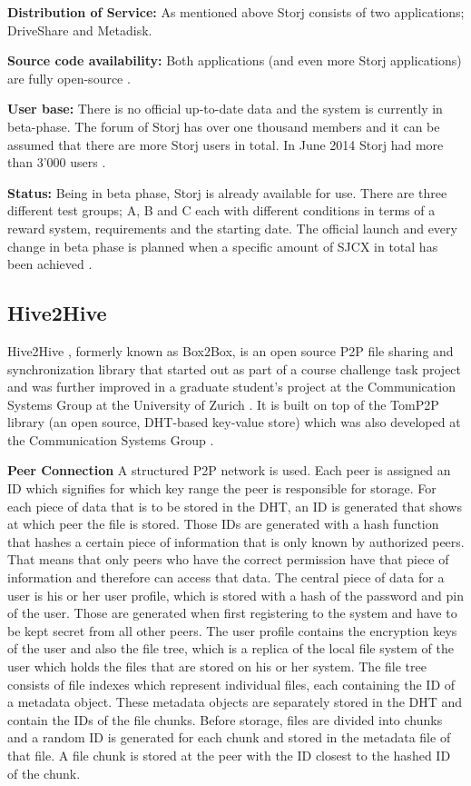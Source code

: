 \textbf{Distribution of Service:} As mentioned above Storj consists of two applications; DriveShare and Metadisk.

\textbf{Source code availability:} Both applications (and even more Storj applications) are fully open-source \cite{storj:github}.

\textbf{User base:} There is no official up-to-date data and the system is currently in beta-phase. The forum of Storj has over one thousand members \cite{storj:forum} and it can be assumed that there are more Storj users in total. In June 2014 Storj had more than 3'000 users \cite{storj:crowdsale}.

\textbf{Status:} Being in beta phase, Storj is already available for use. There are three different test groups; A, B and C each with different conditions in terms of a reward system, requirements and the starting date. The official launch and every change in beta phase is planned when a specific amount of SJCX in total has been achieved \cite {storj:earlyaccess}.

\subsection{Hive2Hive}
Hive2Hive \cite{hive2hive}, formerly known as Box2Box, is an open source P2P file sharing and synchronization library that started out as part of a course challenge task project and was further improved in a graduate student's project at the Communication Systems Group at the University of Zurich \cite{hive2hive:about}. It is built on top of the TomP2P library (an open source, DHT-based key-value store) which was also developed at the Communication Systems Group \cite{tomp2p}.

\textbf{Peer Connection}
A structured P2P network is used. Each peer is assigned an ID which signifies for which key range the peer is responsible for storage. For each piece of data that is to be stored in the DHT, an ID is generated that shows at which peer the file is stored. Those IDs are generated with a hash function that hashes a certain piece of information that is only known by authorized peers. That means that only peers who have the correct permission have that piece of information and therefore can access that data. The central piece of data for a user is his or her user profile, which is stored with a hash of the password and pin of the user. Those are generated when first registering to the system and have to be kept secret from all other peers. The user profile contains the encryption keys of the user and also the file tree, which is a replica of the local file system of the user which holds the files that are stored on his or her system. The file tree consists of file indexes which represent individual files, each containing the ID of a metadata object. These metadata objects are separately stored in the DHT and contain the IDs of the file chunks. Before storage, files are divided into chunks and a random ID is generated for each chunk and stored in the metadata file of that file. A file chunk is stored at the peer with the ID closest to the hashed ID of the chunk.

